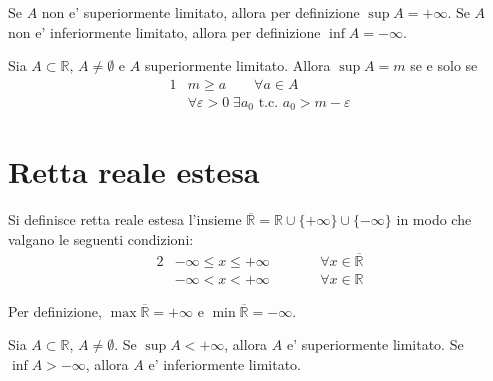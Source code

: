 \documentclass{report}
\newcommand{\RR}{\mathbb{R}}
\newcommand{\extR}{\overline{\RR}}
\begin{document}
    \theoremstyle{definition}
    \begin{defin}
        Se $A$ non e' superiormente limitato, allora per definizione $\sup{A} = +\infty$. \newline
        Se $A$ non e' inferiormente limitato, allora per definizione $\inf{A} = -\infty$.
    \end{defin}

    \theoremstyle{remark}
    \begin{obs}
        Sia $A \subset \RR$, $A \neq \emptyset$ e $A$ superiormente limitato. Allora $\sup{A} = m$
        se e solo se
        \begin{alignat}
            {1}
            &m \geq a \qquad \forall a \in A\\
            &\forall \varepsilon > 0\;\exists a_0 \text{ t.c. } a_0 > m - \varepsilon
        \end{alignat}
    \end{obs}

    \section{Retta reale estesa}
    \theoremstyle{definition}
    \begin{defin}
        Si definisce retta reale estesa l'insieme $\extR = \RR \cup \{+\infty\} \cup \{-\infty\}$
        in modo che valgano le seguenti condizioni:
        \begin{alignat}
            {2}
            &-\infty \leq x \leq +\infty    \qquad &&\forall x \in \extR\\
            &-\infty < x < +\infty          \qquad &&\forall x \in \RR
        \end{alignat} 
    \end{defin}

    \theoremstyle{remark}
    \begin{obs}
        Per definizione, $\max{\extR} = +\infty$ e $\min{\extR} = -\infty$.
    \end{obs}

    \begin{obs}
        Sia $A \subset \RR$, $A \neq \emptyset$. Se $\sup{A} < +\infty$, allora $A$ e'
        superiormente limitato. Se $\inf{A} > -\infty$, allora $A$ e'
        inferiormente limitato.
    \end{obs}
\end{document}
